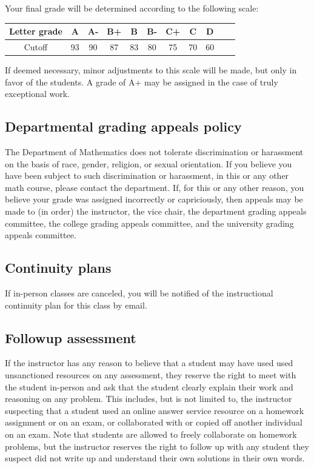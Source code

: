 \documentclass[12pt]{amsart}
\begin{document}
\noindent
Your final grade will be determined according to the following scale:

\begin{center}
\hspace{2em}
\begin{minipage}{0.75\textwidth}
	\begin{tabular}{|c||c|c|c|c|c|c|c|c|c|c|}
	\hline
	Letter grade & A & A- & B+ & B & B- & C+ & C & D \\
	\hline
	Cutoff & 93 & 90 & 87 & 83 & 80 & 75 & 70 & 60 \\
	\hline
\end{tabular}
\end{minipage}
\end{center}

\noindent
If deemed necessary, minor adjustments to this scale will be made, but only in favor of the students. A grade of A+ may be assigned in the case of truly exceptional work.

\subsection*{Departmental grading appeals policy} 
The Department of Mathematics does not tolerate discrimination or harassment on the basis of race, gender, religion, or sexual orientation. If you believe you have been subject to such discrimination or harassment, in this or any other math course, please contact the department. If, for this or any other reason, you believe your grade was assigned incorrectly or capriciously, then appeals may be made to (in order) the instructor, the vice chair, the department grading appeals committee, the college grading appeals committee, and the university grading appeals committee.


\subsection*{Continuity plans} 
If in-person classes are canceled, you will be notified of the instructional continuity plan for this class by email.

\subsection*{Followup assessment} If the instructor has any reason to believe that a student may have used used unsanctioned resources on any assessment, they reserve the right to meet with the student in-person and ask that the student clearly explain their work and reasoning on any problem. This includes, but is not limited to, the instructor suspecting that a student used an online answer service resource on a homework assignment or on an exam, or collaborated with or copied off another individual on an exam. Note that students are allowed to freely collaborate on homework problems, but the instructor reserves the right to follow up with any student they suspect did not write up and {understand} their own solutions in their own words.
\end{document}
